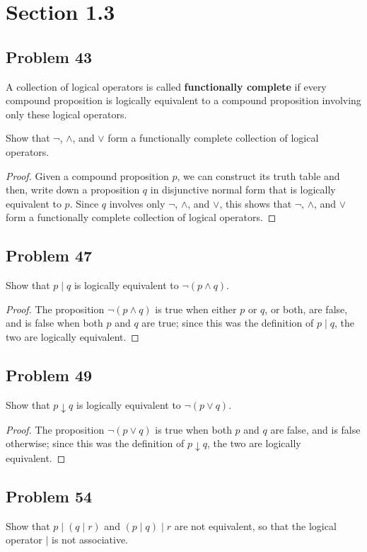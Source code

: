 \documentclass{article}
\begin{document}
\clearpage
\section*{Section 1.3}
\subsection*{Problem 43}
A collection of logical operators is called \textbf{functionally complete} if every compound proposition is logically equivalent to a compound proposition involving only these logical operators.

\noindent
Show that $\neg$, $\land$, and $\lor$ form a functionally complete collection of logical operators.

\begin{proof}
Given a compound proposition $p$, we can construct its truth table and then, write down a proposition $q$ in disjunctive normal form that is logically equivalent to $p$. Since $q$ involves only $\neg$, $\land$, and $\lor$, this shows that $\neg$, $\land$, and $\lor$ form a functionally complete collection of logical operators. 
\end{proof}
\subsection*{Problem 47}
Show that $p \mid q$ is logically equivalent to $\neg (p \land q)$.

\begin{proof}
The proposition $\neg (p \land q)$ is true when either $p$ or $q$, or both, are false, and is false when both $p$ and $q$ are true; since this was the definition of $p \mid q$, the two are logically equivalent.
\end{proof}
\subsection*{Problem 49}
Show that $p \downarrow q$ is logically equivalent to $\neg (p \lor q)$.

\begin{proof}
The proposition $\neg (p \lor q)$ is true when both $p$ and $q$ are false, and is false otherwise; since this was the definition of $p \downarrow q$, the two are logically equivalent.
\end{proof}
\subsection*{Problem 54}
Show that $p \mid (q \mid r)$ and $(p \mid q) \mid r$ are not equivalent, so that the logical operator $\mid$ is not associative.
\end{document}
